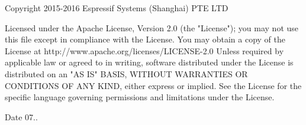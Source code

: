 \begin{DoxyVerb}   Copyright 2015-2016 Espressif Systems (Shanghai) PTE LTD

   Licensed under the Apache License, Version 2.0 (the "License");    
   you may not use this file except in compliance with the License.    
   You may obtain a copy of the License at    
   http://www.apache.org/licenses/LICENSE-2.0    
   Unless required by applicable law or agreed to in writing, software    
   distributed under the License is distributed on an "AS IS" BASIS,    
   WITHOUT WARRANTIES OR CONDITIONS OF ANY KIND, either express or implied.    
   See the License for the specific language governing permissions and    
   limitations under the License.
\end{DoxyVerb}


\begin{DoxyDate}{Date}
07.. 
\end{DoxyDate}
